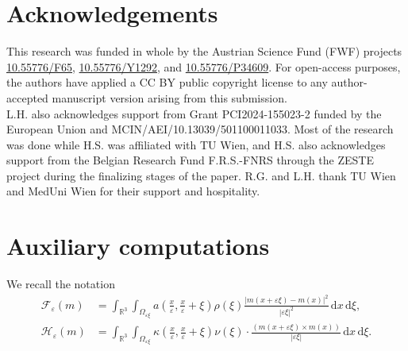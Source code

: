 \documentclass[reqno,11pt]{amsart}
\numberwithin{equation}{section}
\theoremstyle{thmlemcorr}
\numberwithin{theorem}{section}
\theoremstyle{thmlemcorr*}
\theoremstyle{defi}
\theoremstyle{remexample}
\theoremstyle{ass}
\newcommand{\R}{\mathbb{R}}
\newcommand{\Fcal}{\mathcal{F}}
\newcommand{\Hcal}{\mathcal{H}}
\renewcommand{\epsilon}{\varepsilon}
\newcommand{\dd}{\,\mathrm{d}}
\newcommand{\1}{\mathds{1}}
\newcommand{\veps}{\varepsilon}
\begin{document}
\section*{Acknowledgements}
\noindent 
This research was funded in whole
by the Austrian Science Fund (FWF) projects \href{https://doi.org/10.55776/F65}{10.55776/F65}, \href{https://doi.org/10.55776/Y1292}{10.55776/Y1292}, and \href{https://doi.org/10.55776/P34609}{10.55776/P34609}. For open-access purposes, the authors have applied a CC BY public copyright license to any author-accepted manuscript version arising from this
submission. \\
L.H. also acknowledges support from Grant PCI2024-155023-2 funded by the European Union and MCIN/AEI/10.13039/501100011033. Most of the research was done while H.S. was affiliated with TU Wien, and H.S. also acknowledges support from the Belgian Research Fund F.R.S.-FNRS through the ZESTE project during the finalizing stages of the paper. R.G. and L.H. thank TU Wien and MedUni Wien for their support and hospitality. 



\appendix
\section{Auxiliary computations}\label{app:a}
We recall the notation
\begin{align*}
    \Fcal_\epsilon(m)&=\int_{\R^3 } \int_{\Omega_{\veps \xi}} a\left(\frac{x}{\epsilon},\frac{x}{\epsilon} + \xi \right) \rho(\xi)  \frac{|m(x + \veps \xi)-m(x)|^2}{|\veps \xi|^2}\dd x\dd \xi, \\
    \Hcal_\epsilon(m)&=\int_{\R^3 } \int_{\Omega_{\veps \xi}}\kappa \left(\frac{x}{\epsilon},\frac{x}{\epsilon} + \xi \right) \nu(\xi) \cdot\frac{(m(x + \veps \xi)\times m(x))}{|\veps \xi|}\dd x\dd \xi.
\end{align*}
\end{document}
